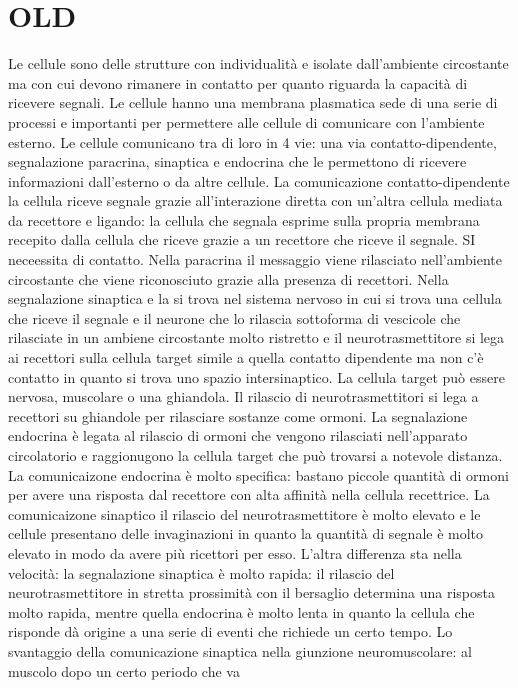 \section{OLD}
Le cellule sono delle strutture con individualit\`a e isolate dall'ambiente circostante ma con cui devono rimanere in contatto per quanto riguarda la capacit\`a di ricevere segnali.
Le cellule hanno una membrana plasmatica sede di una serie di processi e importanti per permettere alle cellule di comunicare con l'ambiente esterno. Le cellule comunicano tra di loro
in 4 vie: una via contatto-dipendente, segnalazione paracrina, sinaptica e endocrina che le permettono di ricevere informazioni dall'esterno o da altre cellule. La comunicazione 
contatto-dipendente la cellula riceve segnale grazie all'interazione diretta con un'altra cellula mediata da recettore e ligando: la cellula che segnala esprime sulla propria membrana
recepito dalla cellula che riceve grazie a un recettore che riceve il segnale. SI neceessita di contatto. Nella paracrina il messaggio viene rilasciato nell'ambiente circostante che 
viene riconosciuto grazie alla presenza di recettori. Nella segnalazione sinaptica e la si trova nel sistema nervoso in cui si trova una cellula che riceve il segnale e il neurone che
lo rilascia sottoforma di vescicole che rilasciate in un ambiene circostante molto ristretto e il neurotrasmettitore si lega ai recettori sulla cellula target simile a quella contatto 
dipendente ma non c'\`e contatto in quanto si trova uno spazio intersinaptico. La cellula target pu\`o essere nervosa, muscolare o una ghiandola. Il rilascio di neurotrasmettitori si 
lega a recettori su ghiandole per rilasciare sostanze come ormoni. La segnalazione endocrina \`e legata al rilascio di ormoni che vengono rilasciati nell'apparato circolatorio e 
raggionugono la cellula target che pu\`o trovarsi a notevole distanza. La comunicaizone endocrina \`e molto specifica: bastano piccole quantit\`a di ormoni per avere una risposta dal
recettore con alta affinit\`a nella cellula recettrice. La comunicaizone sinaptico il rilascio del neurotrasmettitore \`e molto elevato e le cellule presentano delle invaginazioni in 
quanto la quantit\`a di segnale \`e molto elevato in modo da avere pi\`u ricettori per esso. L'altra differenza sta nella velocit\`a: la segnalazione sinaptica \`e molto rapida: il 
rilascio del neurotrasmettitore in stretta prossimit\`a con il bersaglio determina una risposta molto rapida, mentre quella endocrina \`e molto lenta in quanto la cellula che risponde
d\`a origine a una serie di eventi che richiede un certo tempo. Lo svantaggio della comunicazione sinaptica nella giunzione neuromuscolare: al muscolo dopo un certo periodo che va 
